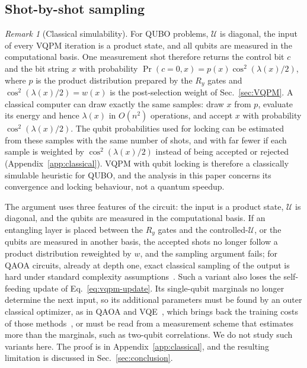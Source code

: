 \documentclass[onecolumn,10pt]{article}
\theoremstyle{remark}
\newtheorem{remark}[proposition]{Remark}
\theoremstyle{plain}
\begin{document}
\subsection{Shot-by-shot sampling}
\label{sec:sampling}
\begin{remark}[Classical simulability]
\label{rem:classical}
For QUBO problems, $\mathcal{U}$ is diagonal, the input of every VQPM iteration is a product state, and all qubits are measured in the computational basis. One measurement shot therefore returns the control bit $c$ and the bit string $x$ with probability $\Pr(c=0,x)=p(x)\cos^2(\lambda(x)/2)$, where $p$ is the product distribution prepared by the $R_y$ gates and $\cos^2(\lambda(x)/2)=w(x)$ is the post-selection weight of Sec.~\ref{sec:VQPM}. A classical computer can draw exactly the same samples: draw $x$ from $p$, evaluate its energy and hence $\lambda(x)$ in $O(n^2)$ operations, and accept $x$ with probability $\cos^2(\lambda(x)/2)$. The qubit probabilities used for locking can be estimated from these samples with the same number of shots, and with far fewer if each sample is weighted by $\cos^2(\lambda(x)/2)$ instead of being accepted or rejected (Appendix~\ref{app:classical}). VQPM with qubit locking is therefore a classically simulable heuristic for QUBO, and the analysis in this paper concerns its convergence and locking behaviour, not a quantum speedup.

The argument uses three features of the circuit: the input is a product state, $\mathcal U$ is diagonal, and the qubits are measured in the computational basis. If an entangling layer is placed between the $R_y$ gates and the controlled-$\mathcal U$, or the qubits are measured in another basis, the accepted shots no longer follow a product distribution reweighted by $w$, and the sampling argument fails; for QAOA circuits, already at depth one, exact classical sampling of the output is hard under standard complexity assumptions~\cite{farhi2016quantum}. Such a variant also loses the self-feeding update of Eq.~\eqref{eq:vqpm-update}. Its single-qubit marginals no longer determine the next input, so its additional parameters must be found by an outer classical optimizer, as in QAOA and VQE~\cite{peruzzo2014variational}, which brings back the training costs of those methods~\cite{bittel2021training}, or must be read from a measurement scheme that estimates more than the marginals, such as two-qubit correlations. We do not study such variants here. The proof is in Appendix~\ref{app:classical}, and the resulting limitation is discussed in Sec.~\ref{sec:conclusion}.
\end{remark}
\end{document}
